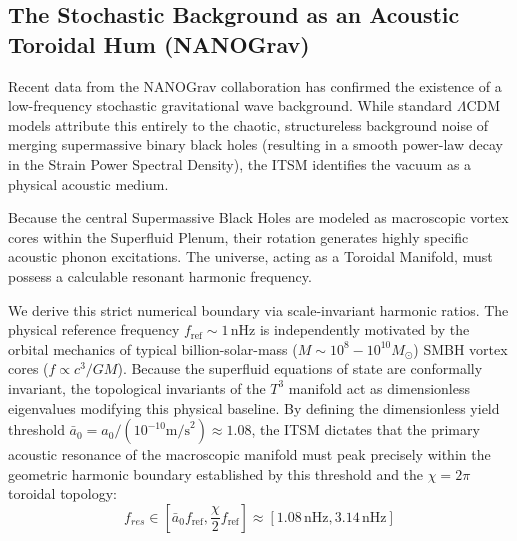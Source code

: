 \documentclass[aps,prd,10pt,twocolumn,superscriptaddress,nofootinbib,floatfix]{revtex4-2}
\begin{document}
\subsection{The Stochastic Background as an Acoustic Toroidal Hum (NANOGrav)}
Recent data from the NANOGrav collaboration \cite{nanograv} has confirmed the existence of a low-frequency stochastic gravitational wave background. While standard $\Lambda$CDM models attribute this entirely to the chaotic, structureless background noise of merging supermassive binary black holes (resulting in a smooth power-law decay in the Strain Power Spectral Density), the ITSM identifies the vacuum as a physical acoustic medium. 

Because the central Supermassive Black Holes are modeled as macroscopic vortex cores within the Superfluid Plenum, their rotation generates highly specific acoustic phonon excitations. The universe, acting as a Toroidal Manifold, must possess a calculable resonant harmonic frequency.

We derive this strict numerical boundary via scale-invariant harmonic ratios. The physical reference frequency $f_{\text{ref}} \sim 1\,\text{nHz}$ is independently motivated by the orbital mechanics of typical billion-solar-mass ($M \sim 10^8 - 10^{10} M_\odot$) SMBH vortex cores ($f \propto c^3/GM$). Because the superfluid equations of state are conformally invariant, the topological invariants of the $T^3$ manifold act as dimensionless eigenvalues modifying this physical baseline. By defining the dimensionless yield threshold $\bar{a}_0 = a_0 / (10^{-10} \text{m/s}^2) \approx 1.08$, the ITSM dictates that the primary acoustic resonance of the macroscopic manifold must peak precisely within the geometric harmonic boundary established by this threshold and the $\chi=2\pi$ toroidal topology:
\begin{equation}
f_{res} \in [\bar{a}_0 f_{\text{ref}}, \frac{\chi}{2} f_{\text{ref}}] \approx [1.08\,\text{nHz}, 3.14\,\text{nHz}]
\end{equation}
\end{document}
